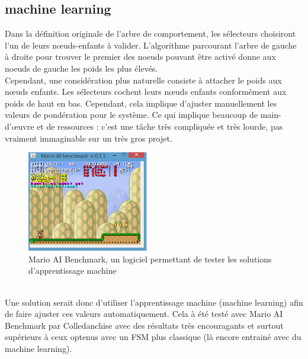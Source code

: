 \documentclass[titlepage]{article}
\begin{document}
		\subsection{machine learning}
		Dans la définition originale de l’arbre de comportement, les sélecteurs choisiront l’un de leurs nœuds-enfants à valider. L’algorithme parcourant l'arbre de gauche à droite pour trouver le premier des noeuds pouvant être activé donne aux noeuds de gauche les poids les plus élevés. \cite{Fu2016/08}
		\\
		Cependant, une considération plus naturelle consiste à attacher le poids aux nœuds enfants. Les sélecteurs cochent leurs nœuds enfants conformément aux poids de haut en bas. Cependant, cela implique d'ajuster manuellement les valeurs de pondération pour le système. Ce qui implique beaucoup de main-d'œuvre et de ressources : c'est une tâche très compliquée et très lourde, pas vraiment immaginable sur un très gros projet. \cite{Fu2016/08}
		\\
	\begin{figure}[h!]
		\centering
		\includegraphics[width=200px]{img/mario-ai-benchmark.png}
		\caption{Mario AI Benchmark, un logiciel permettant de tester les solutions d'apprentissage machine}
		\label{fig:ai-benchmark}
	\end{figure}
		\\
		Une solution serait donc d'utiliser l'apprentissage machine (machine learning) afin de faire ajuster ces valeurs automatiquement. Cela à été testé avec Mario AI Benchmark par Colledanchise avec des résultats très encouragants et surtout supérieurs à ceux optenus avec un FSM plus classique (là encore entrainé avec du machine learning). \cite{colledanchise_2017}
\end{document}
